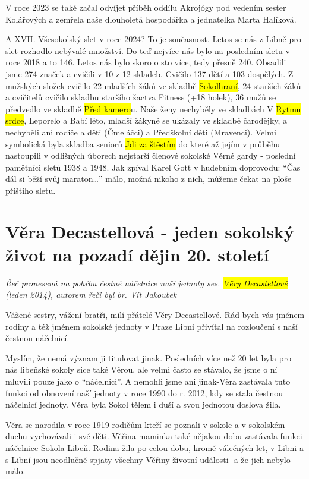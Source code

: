V roce 2023 se také začal odvíjet příběh oddílu Akrojógy pod vedením
sester Kolářových a zemřela naše dlouholetá hospodářka a jednatelka
Marta Halíková.

A XVII. Všesokolský slet v roce 2024? To je současnost. Letos se nás z
Libně pro slet rozhodlo nebývalé množství. Do teď nejvíce nás bylo na
posledním sletu v roce 2018 a to 146. Letos nás bylo skoro o sto více,
tedy přesně 240. Obsadili jsme 274 značek a cvičili v 10 z 12 skladeb.
Cvičilo 137 dětí a 103 dospělých. Z mužských složek cvičilo 22 mladších
žáků ve skladbě \hl{Sokolhraní}, 24 starších žáků a cvičitelů cvičilo
skladbu staršího žactva Fitness (+18 holek), 36 mužů se předvedlo ve
skladbě \hl{Před kamero}u. Naše ženy nechyběly ve skladbách V \hl{Rytmu
srdce}, Leporelo a Babí léto, mladší žákyně se ukázaly ve skladbě
čarodějky, a nechyběli ani rodiče a děti (Čmeláčci) a Předškolní děti
(Mravenci). Velmi symbolická byla skladba seniorů \hl{Jdi za štěstím} do
které až jejím v průběhu nastoupili v odlišných úborech nejstarší
členové sokolské Věrné gardy - poslední pamětníci sletů 1938 a 1948. Jak
zpíval Karel Gott v hudebním doprovodu: ``Čas dál si běží svůj
maraton\ldots'' málo, možná nikoho z nich, můžeme čekat na ploše
příštího sletu.

\section{Věra Decastellová - jeden sokolský život na pozadí dějin 20.
století}\label{vux11bra-decastellovuxe1---jeden-sokolskuxfd-ux17eivot-na-pozaduxed-dux11bjin-20.-stoletuxed}

\emph{Řeč pronesená na pohřbu čestné náčelnice naší jednoty ses.
\hl{Věry Decastellové} (leden 2014), autorem řeči byl br. Vít Jakoubek}

Vážené sestry, vážení bratři, milí přátelé Věry Decastellové. Rád bych
vás jménem rodiny a též jménem sokolské jednoty v Praze Libni přivítal
na rozloučení s naší čestnou náčelnicí.

Myslím, že nemá význam ji titulovat jinak. Posledních více než 20 let
byla pro nás libeňské sokoly sice také Věrou, ale velmi často se
stávalo, že jsme o ní mluvili pouze jako o ``náčelnici''. A nemohli jsme
ani jinak-Věra zastávala tuto funkci od obnovení naší jednoty v roce
1990 do r. 2012, kdy se stala čestnou náčelnicí jednoty. Věra byla Sokol
tělem i duší a svou jednotou doslova žila.

Věra se narodila v roce 1919 rodičům kteří se poznali v sokole a v
sokolském duchu vychovávali i své děti. Věřina maminka také nějakou dobu
zastávala funkci náčelnice Sokola Libeň. Rodina žila po celou dobu,
kromě válečných let, v Libni a s Libní jsou neodlučně spjaty všechny
Věřiny životní události- a že jich nebylo málo.

